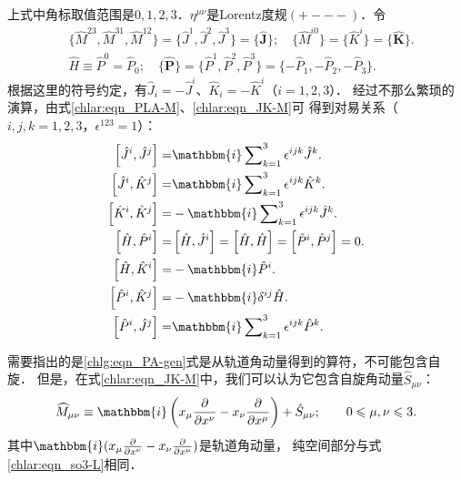 上式中角标取值范围是$0,1,2,3$．$\eta^{\mu \nu}$是Lorentz度规$(+---)$．令
\begin{equation}\label{chlar:eqn_JK-M}
	\begin{aligned}
		&\{\widehat{M}^{23},\widehat{M}^{31},\widehat{M}^{12}\}= \{\hat{J}^1, \hat{J}^2, \hat{J}^3\}=\{\hat{\boldsymbol{J}}\};
		\quad \{\widehat{M}^{i0}\}= \{\hat{K}^i\}=\{\hat{\boldsymbol{K}}\}. \\
		& \hat{H}\equiv \hat{P}^0 = \hat{P}_0;\quad 
		\{\hat{\boldsymbol{P}}\}=\{\hat{P}^1,\hat{P}^2,\hat{P}^3\} =\{-\hat{P}_1,-\hat{P}_2,-\hat{P}_3\}.
	\end{aligned}
\end{equation}
根据这里的符号约定，有$\hat{J}_i=-\hat{J}^i$、$\hat{K}_i=-\hat{K}^i$（$i=1,2,3$）．
经过不那么繁琐的演算，由式\eqref{chlar:eqn_PLA-M}、\eqref{chlar:eqn_JK-M}可
得到对易关系（$i,j,k=1,2,3$，$\epsilon^{123}=1$）：
\begin{subequations}\label{chlar:eqn_PA-iso13-comm-PJK}
	\begin{align}
		\left[\hat{J}^i, \hat{J}^j \right] =& \mathbbm{i} \sum\nolimits_{k=1}^{3} \epsilon^{ijk} \hat{J}^k . \\
		\left[\hat{J}^i, \hat{K}^j\right] =& \mathbbm{i} \sum\nolimits_{k=1}^{3} \epsilon^{ijk} \hat{K}^k . \\
		\left[\hat{K}^i, \hat{K}^j\right] =& -\mathbbm{i}\sum\nolimits_{k=1}^{3} \epsilon^{ijk} \hat{J}^k . \\
		\left[\hat{H}, \hat{P}^i \right] =& \left[\hat{H}, \hat{J}^i \right]
		=\left[\hat{H}, \hat{H} \right] =\left[\hat{P}^i, \hat{P}^j \right] =0 . \\
		\left[\hat{H}, \hat{K}^i \right] = & -\mathbbm{i} \hat{P}^i .\\
		\left[\hat{P}^i, \hat{K}^j \right] =& -\mathbbm{i} \delta^{ij} \hat{H} . \\
		\left[\hat{P}^i, \hat{J}^j \right] =& \mathbbm{i} \sum\nolimits_{k=1}^{3} \epsilon^{ijk} \hat{P}^k .
	\end{align}
\end{subequations}

需要指出的是\eqref{chlg:eqn_PA-gen}式是从轨道角动量得到的算符，不可能包含自旋．
但是，在式\eqref{chlar:eqn_JK-M}中，我们可以认为它包含自旋角动量$\hat{S}_{\mu\nu}$：
\begin{equation}
	\widehat{M}_{\mu\nu}\equiv  \mathbbm{i} \left(
	x_\mu \frac{\partial}{\partial x^\nu}
	-x_\nu \frac{\partial}{\partial x^\mu}\right) + \hat{S}_{\mu\nu};
	\qquad  0\leqslant \mu,\nu \leqslant 3 .
\end{equation}
其中$ \mathbbm{i} (x_\mu \frac{\partial}{\partial x^\nu}
-x_\nu \frac{\partial}{\partial x^\mu})$是轨道角动量，
纯空间部分与式\eqref{chlar:eqn_so3-L}相同．



